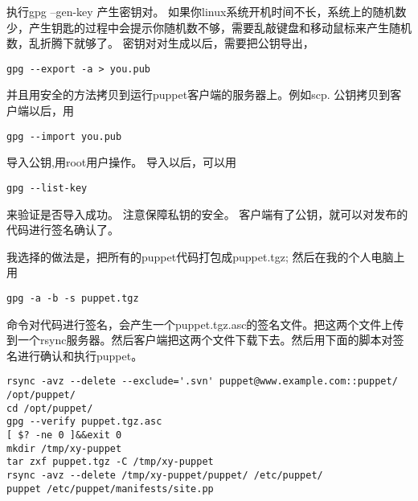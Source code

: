 执行gpg --gen-key 产生密钥对。
如果你linux系统开机时间不长，系统上的随机数少，产生钥匙的过程中会提示你随机数不够，需要乱敲键盘和移动鼠标来产生随机数，乱折腾下就够了。
密钥对对生成以后，需要把公钥导出，
\msyh
\begin{lstlisting}
gpg --export -a > you.pub
\end{lstlisting}
\song
并且用安全的方法拷贝到运行puppet客户端的服务器上。例如scp.
公钥拷贝到客户端以后，用
\msyh
\begin{lstlisting}
gpg --import you.pub 
\end{lstlisting}
\song
导入公钥,用root用户操作。
导入以后，可以用
\msyh
\begin{lstlisting}
gpg --list-key 
\end{lstlisting}
\song
来验证是否导入成功。
注意保障私钥的安全。
客户端有了公钥，就可以对发布的代码进行签名确认了。\par
我选择的做法是，把所有的puppet代码打包成puppet.tgz; 然后在我的个人电脑上用
\msyh
\begin{lstlisting}
gpg -a -b -s puppet.tgz 
\end{lstlisting}
\song
命令对代码进行签名，会产生一个puppet.tgz.asc的签名文件。把这两个文件上传到一个rsync服务器。然后客户端把这两个文件下载下去。然后用下面的脚本对签名进行确认和执行puppet。



\msyh
\begin{lstlisting}
rsync -avz --delete --exclude='.svn' puppet@www.example.com::puppet/ /opt/puppet/
cd /opt/puppet/
gpg --verify puppet.tgz.asc
[ $? -ne 0 ]&&exit 0
mkdir /tmp/xy-puppet
tar zxf puppet.tgz -C /tmp/xy-puppet
rsync -avz --delete /tmp/xy-puppet/puppet/ /etc/puppet/
puppet /etc/puppet/manifests/site.pp

\end{lstlisting}
\song

